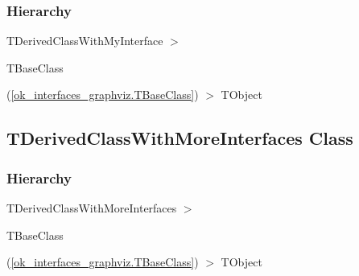 \documentclass{report}
\begin{document}
\subsubsection*{\large{\textbf{Hierarchy}}\normalsize\hspace{1ex}\hfill}
TDerivedClassWithMyInterface {$>$} \begin{ttfamily}TBaseClass\end{ttfamily}(\ref{ok_interfaces_graphviz.TBaseClass}) {$>$} 
TObject
\subsection*{TDerivedClassWithMoreInterfaces Class}
\subsubsection*{\large{\textbf{Hierarchy}}\normalsize\hspace{1ex}\hfill}
TDerivedClassWithMoreInterfaces {$>$} \begin{ttfamily}TBaseClass\end{ttfamily}(\ref{ok_interfaces_graphviz.TBaseClass}) {$>$} 
TObject
\end{document}
